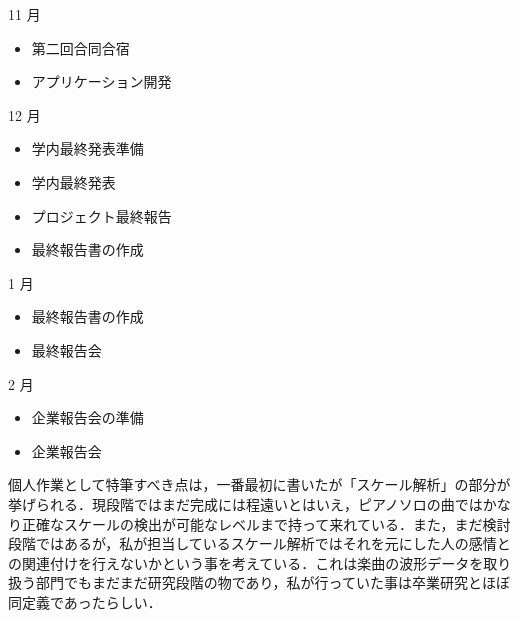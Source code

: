 11 月
\begin{itemize}
\item 第二回合同合宿
\item アプリケーション開発
\end{itemize}
12 月
\begin{itemize}
\item 学内最終発表準備
\item 学内最終発表
\item プロジェクト最終報告
\item 最終報告書の作成
\end{itemize}
1 月
\begin{itemize}
\item 最終報告書の作成
\item 最終報告会
\end{itemize}
2 月
\begin{itemize}
\item 企業報告会の準備
\item 企業報告会
\end{itemize}
個人作業として特筆すべき点は，一番最初に書いたが「スケール解析」の部分が挙げられる．現段階ではまだ完成には程遠いとはいえ，ピアノソロの曲ではかなり正確なスケールの検出が可能なレベルまで持って来れている．また，まだ検討段階ではあるが，私が担当しているスケール解析ではそれを元にした人の感情との関連付けを行えないかという事を考えている．これは楽曲の波形データを取り扱う部門でもまだまだ研究段階の物であり，私が行っていた事は卒業研究とほぼ同定義であったらしい．
